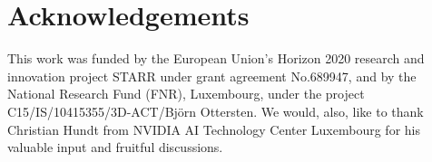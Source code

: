 \documentclass{article}
\begin{document}
\section{Acknowledgements}
\label{sec:acknowledgements}
This work was funded by the European Union's Horizon 2020 research and innovation project STARR under grant agreement No.689947, and by the National Research Fund (FNR), Luxembourg, under the project C15/IS/10415355/3D-ACT/Bj\"{o}rn Ottersten. We would, also, like to thank Christian Hundt from NVIDIA AI Technology Center Luxembourg for his valuable input and fruitful discussions.



\end{document}
